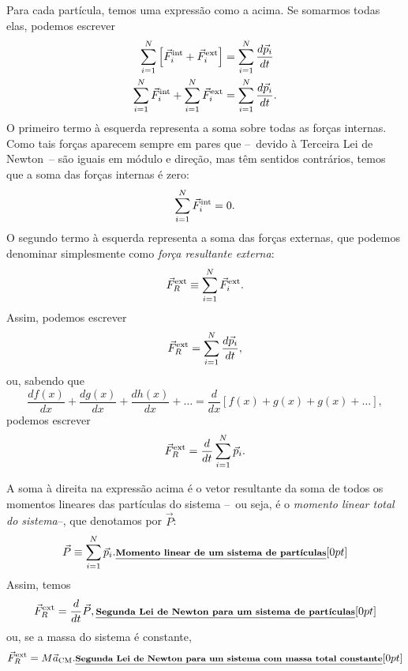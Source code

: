 Para cada partícula, temos uma expressão como a acima. Se somarmos todas elas, podemos escrever
\begin{align}
    \sum_{i=1}^N \left[\vec{F}_i^{\rm{int}} + \vec{F}_i^{\rm{ext}}\right] &= \sum_{i=1}^N \frac{d\vec{p}_i}{dt} \\
    \sum_{i=1}^N \vec{F}_i^{\rm{int}} + \sum_{i=1}^N \vec{F}_i^{\rm{ext}} &= \sum_{i=1}^N \frac{d\vec{p}_i}{dt}.
\end{align}
%
O primeiro termo à esquerda representa a soma sobre todas as forças internas. Como tais forças aparecem sempre em pares que --~devido à Terceira Lei de Newton~-- são iguais em módulo e direção, mas têm sentidos contrários, temos que a soma das forças internas é zero:
\begin{equation}
    \sum_{i=1}^N \vec{F}_i^{\rm{int}} = 0.
\end{equation}
%
O segundo termo à esquerda representa a soma das forças externas, que podemos denominar simplesmente como \emph{força resultante externa}:
\begin{equation}
    \vec{F}_{R}^{\rm{ext}} \equiv \sum_{i=1}^N \vec{F}_i^{\rm{ext}}.
\end{equation}
%
Assim, podemos escrever
\begin{equation}
    \vec{F}_{R}^{\rm{ext}} = \sum_{i=1}^N \frac{d\vec{p}_i}{dt},
\end{equation}
%
ou, sabendo que
\begin{equation}
    \frac{df(x)}{dx} + \frac{dg(x)}{dx} + \frac{dh(x)}{dx} + \dots = \frac{d}{dx} [f(x) + g(x) + g(x) + \dots],
\end{equation}
%
podemos escrever
\begin{equation}
    \vec{F}_{R}^{\rm{ext}} = \frac{d}{dt}\sum_{i=1}^N \vec{p}_i.
\end{equation}

A soma à direita na expressão acima é o vetor resultante da soma de todos os momentos lineares das partículas do sistema --~ou seja, é o \emph{momento linear total do sistema}--, que denotamos por $\vec{P}$:
\begin{equation}\label{Eq:MomentoLinearSistemaDeParticulas}
    \vec{P} \equiv \sum_{i=1}^N \vec{p}_i. \relax{\footnotesize\emph{\textbf{Momento linear de um sistema de partículas}}}[0pt]
\end{equation}
%
Assim, temos
\begin{equation}\label{Eq:SegundaLeiSistemaDeParticulas}
    \vec{F}_{R}^{\rm{ext}} = \frac{d}{dt}\vec{P}, \relax{\footnotesize\emph{\textbf{Segunda Lei de Newton para um sistema de partículas}}}[0pt]
\end{equation}
%
ou, se a massa do sistema é constante,
\begin{equation}\label{Eq:SegundaLeiSistemaDeParticulasMConst}
	\vec{F}_{R}^{\rm{ext}} = M \vec{a}_{\rm{CM}}. \relax{\footnotesize\emph{\textbf{Segunda Lei de Newton para um sistema com massa total constante}}}[0pt]
\end{equation}

